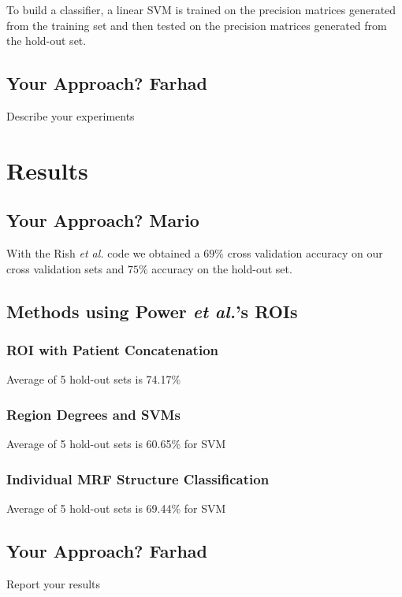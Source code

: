 \documentclass{article} %
\begin{document}
To build a classifier, a linear SVM is trained on the precision matrices 
generated from the training set and then tested on the precision matrices 
generated from the hold-out set.

\subsection{Your Approach? Farhad}
Describe your experiments

\section{Results}

\subsection{Your Approach? Mario}
With the Rish \emph{et al.} code we obtained a $69\%$ cross validation 
accuracy on our cross validation sets and $75\%$ accuracy on the hold-out 
set.

\subsection{Methods using Power \emph{et al.}'s ROIs}

\subsubsection{ROI with Patient Concatenation}
Average of 5 hold-out sets is 74.17\%


\subsubsection{Region Degrees and SVMs}
Average of 5 hold-out sets is 60.65\% for SVM

\subsubsection{Individual MRF Structure Classification}
Average of 5 hold-out sets is 69.44\% for SVM

\subsection{Your Approach? Farhad}
Report your results
\end{document}
